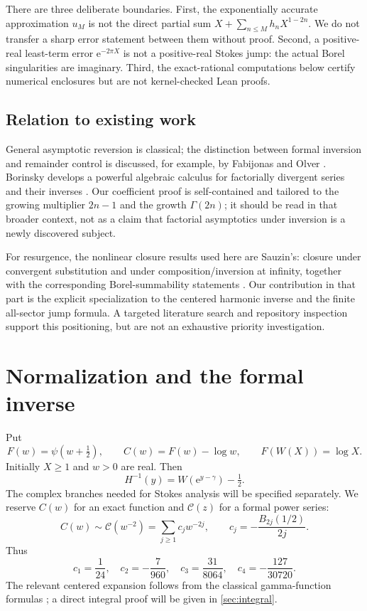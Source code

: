 \documentclass[11pt,a4paper]{article}
\theoremstyle{definition}
\numberwithin{equation}{section}
\newcommand{\ee}{\mathrm{e}}
\newcommand{\cformal}{\mathscr C}
\begin{document}
There are three deliberate boundaries. First, the exponentially accurate approximation $u_M$ is not the direct partial sum $X+\sum_{n\le M}h_nX^{1-2n}$. We do not transfer a sharp error statement between them without proof. Second, a positive-real least-term error $\ee^{-2\pi X}$ is not a positive-real Stokes jump: the actual Borel singularities are imaginary. Third, the exact-rational computations below certify numerical enclosures but are not kernel-checked Lean proofs.

\subsection{Relation to existing work}
General asymptotic reversion is classical; the distinction between formal inversion and remainder control is discussed, for example, by Fabijonas and Olver \cite{fo}. Borinsky develops a powerful algebraic calculus for factorially divergent series and their inverses \cite{borinsky}. Our coefficient proof is self-contained and tailored to the growing multiplier $2n-1$ and the growth $\Gamma(2n)$; it should be read in that broader context, not as a claim that factorial asymptotics under inversion is a newly discovered subject.

For resurgence, the nonlinear closure results used here are Sauzin's: closure under convergent substitution and under composition/inversion at infinity, together with the corresponding Borel-summability statements \cite{sauzin}. Our contribution in that part is the explicit specialization to the centered harmonic inverse and the finite all-sector jump formula. A targeted literature search and repository inspection support this positioning, but are not an exhaustive priority investigation.

\section{Normalization and the formal inverse}
\label{sec:normalization}

Put
\begin{equation}
 F(w)=\psi(w+\tfrac12),\qquad
 C(w)=F(w)-\log w,\qquad
 F(W(X))=\log X.
 \label{eq:normalization}
\end{equation}
Initially $X\ge1$ and $w>0$ are real. Then
\begin{equation}
 H^{-1}(y)=W(\ee^{y-\gamma})-\tfrac12.
 \label{eq:h-inverse}
\end{equation}
The complex branches needed for Stokes analysis will be specified separately. We reserve $C(w)$ for an exact function and $\cformal(z)$ for a formal power series:
\begin{equation}
 C(w)\sim\cformal(w^{-2})=\sum_{j\ge1}c_jw^{-2j},\qquad
 c_j=-\frac{B_{2j}(1/2)}{2j}.
 \label{eq:c-coeff}
\end{equation}
Thus
\begin{equation}
 c_1=\frac1{24},\quad c_2=-\frac7{960},\quad
 c_3=\frac{31}{8064},\quad c_4=-\frac{127}{30720}.
 \label{eq:c-first}
\end{equation}
The relevant centered expansion follows from the classical gamma-function formulas \cite{dlmf}; a direct integral proof will be given in \cref{sec:integral}.
\end{document}

